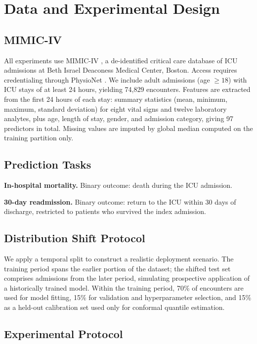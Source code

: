 \documentclass[11pt,a4paper]{article}
\begin{document}
\section{Data and Experimental Design}
\label{sec:data}

\subsection{MIMIC-IV}

All experiments use MIMIC-IV \citep{johnson2016}, a de-identified critical care database of ICU admissions at Beth Israel Deaconess Medical Center, Boston. Access requires credentialing through PhysioNet \citep{goldberger2000}. We include adult admissions (age $\geq 18$) with ICU stays of at least 24 hours, yielding 74,829 encounters. Features are extracted from the first 24 hours of each stay: summary statistics (mean, minimum, maximum, standard deviation) for eight vital signs and twelve laboratory analytes, plus age, length of stay, gender, and admission category, giving 97 predictors in total. Missing values are imputed by global median computed on the training partition only.

\subsection{Prediction Tasks}

\textbf{In-hospital mortality.} Binary outcome: death during the ICU admission.

\textbf{30-day readmission.} Binary outcome: return to the ICU within 30 days of discharge, restricted to patients who survived the index admission.

\subsection{Distribution Shift Protocol}

We apply a temporal split to construct a realistic deployment scenario. The training period spans the earlier portion of the dataset; the shifted test set comprises admissions from the later period, simulating prospective application of a historically trained model. Within the training period, 70\% of encounters are used for model fitting, 15\% for validation and hyperparameter selection, and 15\% as a held-out calibration set used only for conformal quantile estimation.

\subsection{Experimental Protocol}
\end{document}

